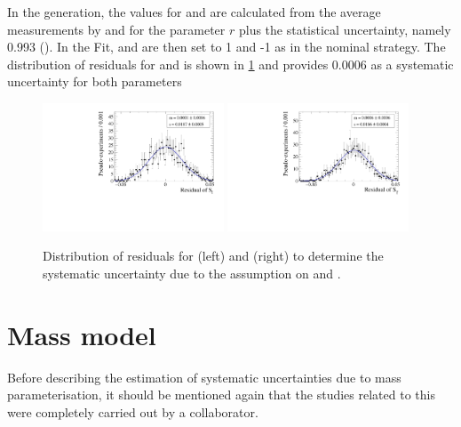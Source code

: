 In the generation, the values for \Cf and \Cfbar are calculated from the average measurements by \belle and \babar for the parameter $r$ plus the statistical uncertainty, namely 0.993 (\cite{Aubert:2008zi, Das:2010be}).
In the Fit, \Cf and \Cfbar are then set to \num{1} and {-1} as in the nominal strategy.
The distribution of residuals for \Sf and \Sfbar is shown in \cref{fig:systUncertC} and provides \num{0.0006} as a systematic uncertainty for both parameters
\begin{figure}[tbp]
    \centering
    \includegraphics[width=0.48\textwidth]{10Systematics/figs/C_Sf_res.pdf}
    \includegraphics[width=0.48\textwidth]{10Systematics/figs/C_Sfbar_res.pdf}
    \caption{Distribution of residuals for \Sf (left) and \Sfbar (right) to determine the systematic uncertainty due to the assumption on \Cf and \Cfbar.}
    \label{fig:systUncertC}
\end{figure}

\section{Mass model}
\label{sec:SystUncertMass}

Before describing the estimation of systematic uncertainties due to mass parameterisation, it should be mentioned again that the studies related to this were completely carried out by a collaborator.

